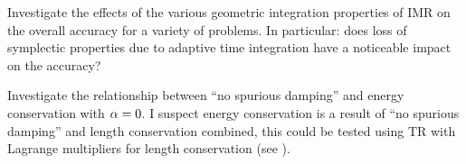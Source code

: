 Investigate the effects of the various geometric integration properties of IMR on the overall accuracy for a variety of problems.
In particular: does loss of symplectic properties due to adaptive time integration have a noticeable impact on the accuracy?


Investigate the relationship between ``no spurious damping'' and energy conservation with $\alpha = 0$.
I suspect energy conservation is a result of ``no spurious damping'' and length conservation combined, this could be tested using TR with Lagrange multipliers for length conservation (see \eg \cite{Szambolics2008a}).


